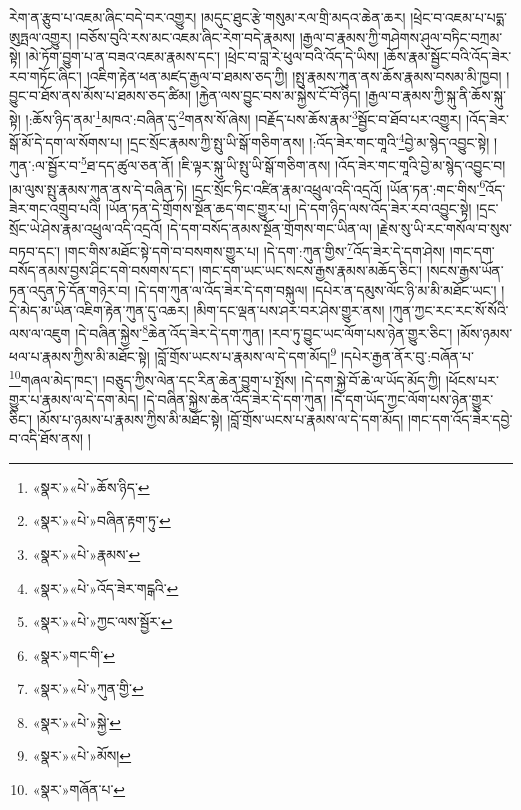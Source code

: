 རེག་ན་རྩུབ་པ་འཇམ་ཞིང་བདེ་བར་འགྱུར། །མདུང་ཐུང་རྩེ་གསུམ་རལ་གྲི་མདའ་ཆེན་ཆར། །ཕྲེང་བ་འཇམ་པ་པདྨ་ཨུཏྤལ་འགྱུར། །བཅོས་བུའི་རས་མང་འཇམ་ཞིང་རེག་བདེ་རྣམས། །རྒྱལ་བ་རྣམས་ཀྱི་གཤེགས་ཤུལ་བཏིང་བཀྲམ་སྟེ། །མེ་ཏོག་བྱུག་པ་ན་བཟའ་འཇམ་རྣམས་དང་། །ཕྲེང་བ་བླ་རེ་ཕུལ་བའི་འོད་དེ་ཡིས། །ཆོས་རྣམ་སྦྱོང་བའི་འོད་ཟེར་རབ་གཏོང་ཞིང་། །འཇིག་རྟེན་ཕན་མཛད་རྒྱལ་བ་ཐམས་ཅད་ཀྱི། །སྤུ་རྣམས་ཀུན་ནས་ཆོས་རྣམས་བསམ་མི་ཁྱབ། །བྱུང་བ་ཐོས་ནས་མོས་པ་ཐམས་ཅད་ཚིམ། །རྐྱེན་ལས་བྱུང་བས་མ་སྐྱེས་ངོ་བོ་ཉིད། །རྒྱལ་བ་རྣམས་ཀྱི་སྐུ་ནི་ཆོས་སྐུ་སྟེ། །:ཆོས་ཉིད་ནམ་\footnote{«སྣར་»«པེ་»ཆོས་ཉིད་}མཁའ་:བཞིན་དུ་\footnote{«སྣར་»«པེ་»བཞིན་རྟག་ཏུ་}གནས་སོ་ཞེས། །བརྗོད་པས་ཆོས་རྣམ་\footnote{«སྣར་»«པེ་»རྣམས་}སྦྱོང་བ་ཐོབ་པར་འགྱུར། །འོད་ཟེར་སྒོ་མོ་དེ་དག་ལ་སོགས་པ། །དྲང་སྲོང་རྣམས་ཀྱི་སྤུ་ཡི་སྒོ་གཅིག་ནས། །:འོད་ཟེར་གང་གཱའི་\footnote{«སྣར་»«པེ་»འོད་ཟེར་གངྒའི་}བྱེ་མ་སྙེད་འབྱུང་སྟེ། །ཀུན་:ལ་སྦྱོར་བ་\footnote{«སྣར་»«པེ་»ཀྱང་ལས་སྦྱོར་}ཐ་དད་ཚུལ་ཅན་ནོ། །ཇི་ལྟར་སྐུ་ཡི་སྤུ་ཡི་སྒོ་གཅིག་ནས། །འོད་ཟེར་གང་གཱའི་བྱེ་མ་སྙེད་འབྱུང་བ། །མ་ལུས་སྤུ་རྣམས་ཀུན་ནས་དེ་བཞིན་ཏེ། །དྲང་སྲོང་ཏིང་འཛིན་རྣམ་འཕྲུལ་འདི་འདྲའོ། །ཡོན་ཏན་:གང་གིས་\footnote{«སྣར་»གང་གི་}འོད་ཟེར་གང་འགྲུབ་པའི། །ཡོན་ཏན་དེ་གྲོགས་སྔོན་ཆད་གང་གྱུར་པ། །དེ་དག་ཉིད་ལས་འོད་ཟེར་རབ་འབྱུང་སྟེ། །དྲང་སྲོང་ཡེ་ཤེས་རྣམ་འཕྲུལ་འདི་འདྲའོ། །དེ་དག་བསོད་ནམས་སྔོན་གྲོགས་གང་ཡིན་ལ། །རྗེས་སུ་ཡི་རང་གསོལ་བ་སུས་བཏབ་དང་། །གང་གིས་མཐོང་སྟེ་དགེ་བ་བསགས་གྱུར་པ། །དེ་དག་:ཀུན་གྱིས་\footnote{«སྣར་»«པེ་»ཀུན་གྱི་}འོད་ཟེར་དེ་དག་ཤེས། །གང་དག་བསོད་ནམས་བྱས་ཤིང་དགེ་བསགས་དང་། །གང་དག་ཡང་ཡང་སངས་རྒྱས་རྣམས་མཆོད་ཅིང་། །སངས་རྒྱས་ཡོན་ཏན་འདུན་ཏེ་དོན་གཉེར་བ། །དེ་དག་ཀུན་ལ་འོད་ཟེར་དེ་དག་བསྐུལ། །དཔེར་ན་དམུས་ལོང་ཉི་མ་མི་མཐོང་ཡང་། །དེ་མེད་མ་ཡིན་འཇིག་རྟེན་ཀུན་དུ་འཆར། །མིག་དང་ལྡན་པས་ཤར་བར་ཤེས་གྱུར་ནས། །ཀུན་ཀྱང་རང་རང་སོ་སོའི་ལས་ལ་འཇུག །དེ་བཞིན་སྐྱེས་\footnote{«སྣར་»«པེ་»སྐྱེ་}ཆེན་འོད་ཟེར་དེ་དག་ཀུན། །རབ་ཏུ་བྱུང་ཡང་ལོག་པས་ཉེན་གྱུར་ཅིང་། །མོས་ཉམས་ཕལ་པ་རྣམས་ཀྱིས་མི་མཐོང་སྟེ། །བློ་གྲོས་ཡངས་པ་རྣམས་ལ་དེ་དག་མོད།\footnote{«སྣར་»«པེ་»མོས།} །དཔེར་རྒྱན་ནོར་བུ་:བཞོན་པ་\footnote{«སྣར་»གཞོན་པ་}གཞལ་མེད་ཁང་། །བཅུད་ཀྱིས་ལེན་དང་རིན་ཆེན་བྱུག་པ་སྤོས། །དེ་དག་སྐྱེ་བོ་ཆེ་ལ་ཡོད་མོད་ཀྱི། །ཕོངས་པར་གྱུར་པ་རྣམས་ལ་དེ་དག་མེད། །དེ་བཞིན་སྐྱེས་ཆེན་འོད་ཟེར་དེ་དག་ཀུན། །དེ་དག་ཡོད་ཀྱང་ལོག་པས་ཉེན་གྱུར་ཅིང་། །མོས་པ་ཉམས་པ་རྣམས་ཀྱིས་མི་མཐོང་སྟེ། །བློ་གྲོས་ཡངས་པ་རྣམས་ལ་དེ་དག་མོད། །གང་དག་འོད་ཟེར་དབྱེ་བ་འདི་ཐོས་ནས། །
